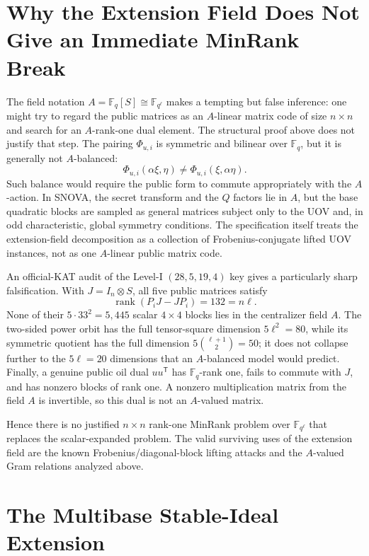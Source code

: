 \documentclass[runningheads]{llncs}
\newcommand{\F}{\mathbb F}
\newcommand{\rank}{\operatorname{rank}}
\newcommand{\transpose}{\mathsf T}
\newcommand{\SNOVA}{\textsf{SNOVA}}
\begin{document}
\section{Why the Extension Field Does Not Give an Immediate MinRank Break}\label{app:noAshortcut}

The field notation $A=\F_q[S]\cong\F_{q^\ell}$ makes a tempting but false
inference: one might try to regard the public matrices as an $A$-linear matrix
code of size $n\times n$ and search for an $A$-rank-one dual element.  The
structural proof above does not justify that step.  The pairing
$\Phi_{u,i}$ is symmetric and bilinear over $\F_q$, but it is generally not
$A$-balanced:
\[
 \Phi_{u,i}(\alpha\xi,\eta)
 \ne
 \Phi_{u,i}(\xi,\alpha\eta).
\]
Such balance would require the public form to commute appropriately with the
$A$-action.  In \SNOVA{}, the secret transform and the $Q$ factors lie in
$A$, but the base quadratic blocks are sampled as general matrices subject
only to the UOV and, in odd characteristic, global symmetry conditions.  The
specification itself treats the extension-field decomposition as a collection
of Frobenius-conjugate lifted UOV instances, not as one $A$-linear public
matrix code.

An official-KAT audit of the Level-I $(28,5,19,4)$ key gives a particularly
sharp falsification.  With $J=I_n\otimes S$, all five public matrices satisfy
\[
 \rank(P_iJ-JP_i)=132=n\ell.
\]
None of their $5\cdot33^2=5{,}445$ scalar $4\times4$ blocks lies in the
centralizer field $A$.  The two-sided power orbit has the full tensor-square
dimension $5\ell^2=80$, while its symmetric quotient has the full dimension
$5\binom{\ell+1}{2}=50$; it does not collapse further to the
$5\ell=20$ dimensions that an $A$-balanced model would predict.  Finally, a
genuine public oil dual $uu^\transpose$ has $\F_q$-rank one, fails to commute
with $J$, and has nonzero blocks of rank one.  A nonzero multiplication matrix
from the field $A$ is invertible, so this dual is not an $A$-valued matrix.

Hence there is no justified $n\times n$ rank-one MinRank problem over
$\F_{q^\ell}$ that replaces the scalar-expanded problem.  The valid surviving
uses of the extension field are the known Frobenius/diagonal-block lifting
attacks and the $A$-valued Gram relations analyzed above.

\section{The Multibase Stable-Ideal Extension}\label{app:multibase}
\end{document}
